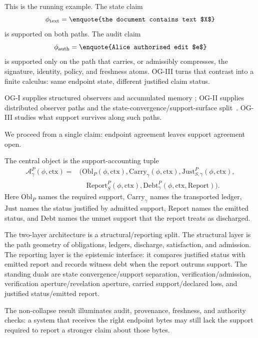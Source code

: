 \documentclass[11pt,twoside]{article}
\theoremstyle{definition}
\newcommand{\Obl}{\mathrm{Obl}}
\newcommand{\Carry}{\mathrm{Carry}}
\newcommand{\Debt}{\mathrm{Debt}}
\newcommand{\Just}{\mathrm{Just}}
\newcommand{\Report}{\mathrm{Report}}
\newcommand{\ctx}{\mathrm{ctx}}
\begin{document}
This is the running example. The state claim
\[
  \phi_{\mathrm{text}}=\text{\enquote{the document contains text $X$}}
\]
is supported on both paths. The audit claim
\[
  \phi_{\mathrm{auth}}=\text{\enquote{Alice authorised edit $e$}}
\]
is supported only on the path that carries, or admissibly compresses, the
signature, identity, policy, and freshness atoms. OG-III turns that contrast
into a finite calculus: same endpoint state, different justified claim status.

OG-I supplies structured observers and accumulated memory
\cite{ross_og_i_2026}; OG-II supplies distributed observer paths and the
state-convergence/support-surface split~\cite{ross_og_ii_2026}. OG-III studies
what support survives along such paths.

We proceed from a single claim: endpoint agreement leaves support agreement open.

The central object is the support-accounting tuple
\[
\begin{aligned}
  \mathcal A_{\gamma}^{P}(\phi,\ctx)
  ={}&
  \bigl(
    \Obl_P(\phi,\ctx),
    \Carry_\gamma(\phi,\ctx),
    \Just_{S,\gamma}^{P}(\phi,\ctx),
    \\[-0.15em]
    &\quad
    \Report_S^P(\phi,\ctx),
    \Debt_\gamma^P(\phi,\ctx,\Report)
  \bigr).
\end{aligned}
\]
Here $\Obl_P$ names the required support, $\Carry_\gamma$ names the transported
ledger, $\Just$ names the status justified by admitted support, $\Report$ names
the emitted status, and $\Debt$ names the unmet support that the report treats
as discharged.

The two-layer architecture is a structural/reporting split. The structural
layer is the path geometry of obligations, ledgers, discharge, satisfaction,
and admission. The reporting layer is the epistemic interface: it compares
justified status with emitted report and records witness debt when the report
outruns support.
The standing duals are state convergence/support separation,
verification/admission, verification aperture/revelation aperture, carried
support/declared loss, and justified status/emitted report.

The non-collapse result illuminates audit, provenance, freshness, and
authority checks: a system that receives the right endpoint bytes may still
lack the support required to report a stronger claim about those bytes.
\end{document}
